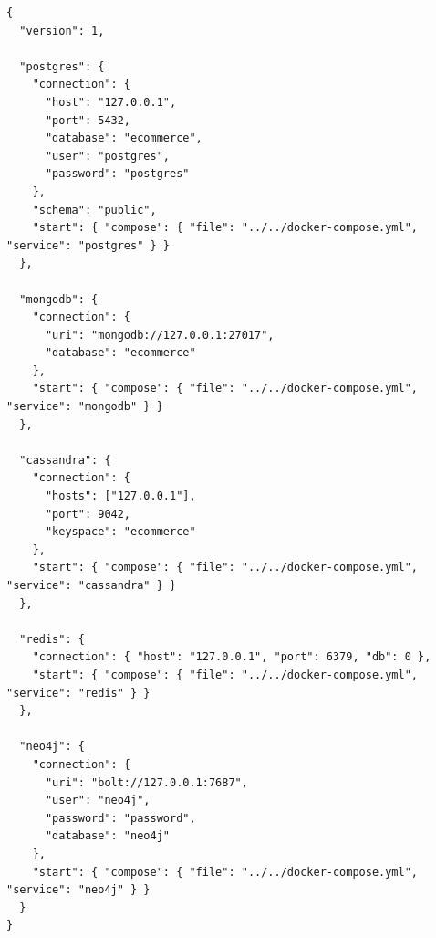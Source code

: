 \begin{lstlisting}[style=jsonstyle,caption={Arquivo de conexão completo do cenário exemplo (\texttt{dbms\_config.json}).},label={lst:dbms-config-full}]
{
  "version": 1,

  "postgres": {
    "connection": {
      "host": "127.0.0.1",
      "port": 5432,
      "database": "ecommerce",
      "user": "postgres",
      "password": "postgres"
    },
    "schema": "public",
    "start": { "compose": { "file": "../../docker-compose.yml", "service": "postgres" } }
  },

  "mongodb": {
    "connection": {
      "uri": "mongodb://127.0.0.1:27017",
      "database": "ecommerce"
    },
    "start": { "compose": { "file": "../../docker-compose.yml", "service": "mongodb" } }
  },

  "cassandra": {
    "connection": {
      "hosts": ["127.0.0.1"],
      "port": 9042,
      "keyspace": "ecommerce"
    },
    "start": { "compose": { "file": "../../docker-compose.yml", "service": "cassandra" } }
  },

  "redis": {
    "connection": { "host": "127.0.0.1", "port": 6379, "db": 0 },
    "start": { "compose": { "file": "../../docker-compose.yml", "service": "redis" } }
  },

  "neo4j": {
    "connection": {
      "uri": "bolt://127.0.0.1:7687",
      "user": "neo4j",
      "password": "password",
      "database": "neo4j"
    },
    "start": { "compose": { "file": "../../docker-compose.yml", "service": "neo4j" } }
  }
}
\end{lstlisting}
